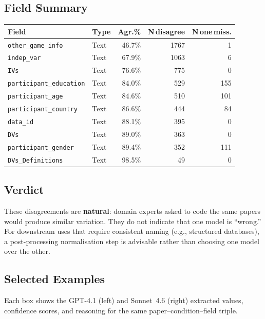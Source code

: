 \documentclass[11pt,a4paper]{article}
\begin{document}
        \subsection{Field Summary}
        \begin{center}\small
\begin{tabular}{llrrr}
\toprule
\textbf{Field} & \textbf{Type} & \textbf{Agr.\%} & \textbf{N\,disagree} & \textbf{N\,one\,miss.}\\
\midrule
\rowcolor{red!18}\texttt{other\_game\_info} & Text & 46.7\% & 1767 & 1\\
\rowcolor{orange!28}\texttt{indep\_var} & Text & 67.9\% & 1063 & 6\\
\rowcolor{orange!28}\texttt{IVs} & Text & 76.6\% & 775 & 0\\
\rowcolor{green!18}\texttt{participant\_education} & Text & 84.0\% & 529 & 155\\
\rowcolor{green!18}\texttt{participant\_age} & Text & 84.6\% & 510 & 101\\
\rowcolor{green!18}\texttt{participant\_country} & Text & 86.6\% & 444 & 84\\
\rowcolor{green!18}\texttt{data\_id} & Text & 88.1\% & 395 & 0\\
\rowcolor{green!18}\texttt{DVs} & Text & 89.0\% & 363 & 0\\
\rowcolor{green!18}\texttt{participant\_gender} & Text & 89.4\% & 352 & 111\\
\rowcolor{green!18}\texttt{DVs\_Definitions} & Text & 98.5\% & 49 & 0\\
\bottomrule
\end{tabular}
\end{center}

        \subsection{Verdict}
        These disagreements are \textbf{natural}: domain experts asked to code the
same papers would produce similar variation.  They do not indicate that one
model is ``wrong.''  For downstream uses that require consistent naming
(e.g., structured databases), a post-processing normalisation step is
advisable rather than choosing one model over the other.


        \subsection{Selected Examples}
        Each box shows the GPT-4.1 (left) and Sonnet~4.6 (right) extracted values,
        confidence scores, and reasoning for the same paper--condition--field triple.
\end{document}
